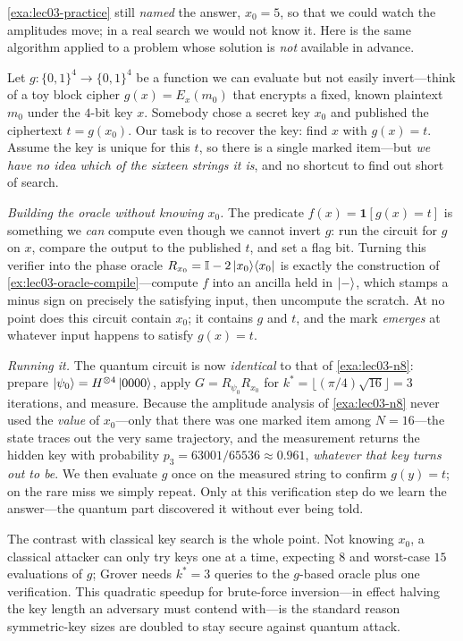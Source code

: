 \begin{example}
\label{exa:lec03-unknown}
\cref{exa:lec03-practice} still \emph{named} the answer, $x_0=5$, so that we could
watch the amplitudes move; in a real search we would not know it. Here is the same
algorithm applied to a problem whose solution is \emph{not} available in advance.

Let $g:\{0,1\}^{4}\to\{0,1\}^{4}$ be a function we can evaluate but not easily
invert---think of a toy block cipher $g(x)=E_x(m_0)$ that encrypts a fixed, known
plaintext $m_0$ under the $4$-bit key $x$. Somebody chose a secret key $x_0$ and
published the ciphertext $t=g(x_0)$. Our task is to recover the key: find $x$ with
$g(x)=t$. Assume the key is unique for this $t$, so there is a single marked item---but
\emph{we have no idea which of the sixteen strings it is}, and no shortcut to find out
short of search.

\emph{Building the oracle without knowing $x_0$.} The predicate
$f(x)=\mathbf 1[g(x)=t]$ is something we \emph{can} compute even though we cannot invert
$g$: run the circuit for $g$ on $x$, compare the output to the published $t$, and set a
flag bit. Turning this verifier into the phase oracle $R_{x_0}=\mathbb{I}-2\ket{x_0}\!\bra{x_0}$ is
exactly the construction of \cref{ex:lec03-oracle-compile}---compute $f$ into an ancilla
held in $\ket-$, which stamps a minus sign on precisely the satisfying input, then
uncompute the scratch. At no point does this circuit contain $x_0$; it contains $g$ and
$t$, and the mark \emph{emerges} at whatever input happens to satisfy $g(x)=t$.

\emph{Running it.} The quantum circuit is now \emph{identical} to that of
\cref{exa:lec03-n8}: prepare $\ket{\psi_0}=H^{\otimes4}\ket{0000}$, apply
$G=R_{\psi_0}R_{x_0}$ for $k^{\ast}=\lfloor(\pi/4)\sqrt{16}\rfloor=3$ iterations, and
measure. Because the amplitude analysis of \cref{exa:lec03-n8} never used the
\emph{value} of $x_0$---only that there was one marked item among $N=16$---the state
traces out the very same trajectory, and the measurement returns the hidden key with
probability $p_3=63001/65536\approx0.961$, \emph{whatever that key turns out to be}. We
then evaluate $g$ once on the measured string to confirm $g(y)=t$; on the rare miss we
simply repeat. Only at this verification step do we learn the answer---the quantum part
discovered it without ever being told.

The contrast with classical key search is the whole point. Not knowing $x_0$, a
classical attacker can only try keys one at a time, expecting $8$ and worst-case $15$
evaluations of $g$; Grover needs $k^{\ast}=3$ queries to the $g$-based oracle plus one
verification. This quadratic speedup for brute-force inversion---in effect halving the
key length an adversary must contend with---is the standard reason symmetric-key sizes
are doubled to stay secure against quantum attack.
\end{example}

